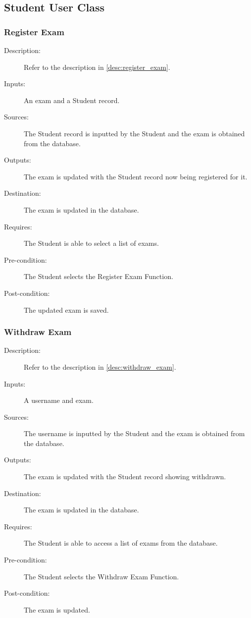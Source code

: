 \subsection{Student User Class}

\subsubsection{\large Register Exam} 
\begin{boxed} %
\begin{description}
\item[Description:]
   Refer to the description in \autoref{desc:register_exam}.
\item[Inputs:]
   An exam and a Student record.
\item[Sources:]
   The Student record is inputted by the Student and the exam is
   obtained from the database.
\item[Outputs:]
   The exam is updated with the Student record now being registered for
   it.
\item[Destination:]
   The exam is updated in the database.
\item[Requires:]
   The Student is able to select a list of exams.
\item[Pre-condition:]
   The Student selects the Register Exam Function.
\item[Post-condition:]
   The updated exam is saved.
\end{description}
\end{boxed} %

\subsubsection{\large Withdraw Exam} 
\begin{boxed} %
\begin{description}
\item[Description:]
   Refer to the description in \autoref{desc:withdraw_exam}.
\item[Inputs:]
   A username and exam.
\item[Sources:]
   The username is inputted by the Student and the exam is obtained from
   the database.
\item[Outputs:]
   The exam is updated with the Student record showing withdrawn.
\item[Destination:]
   The exam is updated in the database.
\item[Requires:]
   The Student is able to access a list of exams from the database.
\item[Pre-condition:]
   The Student selects the Withdraw Exam Function.
\item[Post-condition:]
   The exam is updated.
\end{description}
\end{boxed} %

